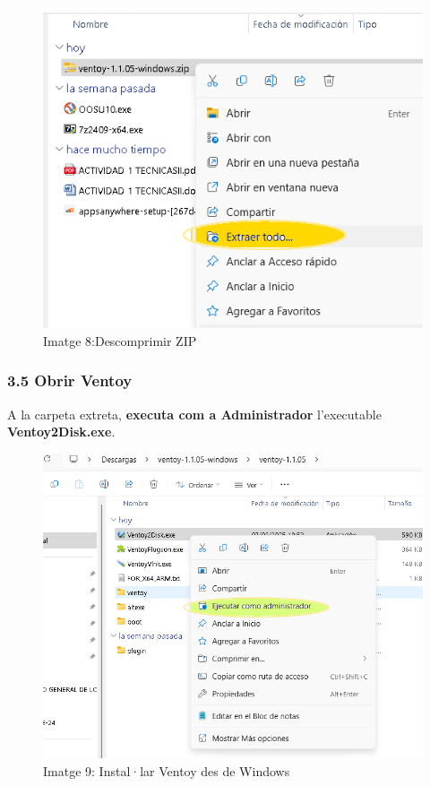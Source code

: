 \documentclass[
  12 pt,
  a4paper,
]{article}
\begin{document}
\begin{figure}
\centering
\includegraphics{png/extraerZip.png}
\caption{Imatge 8:Descomprimir ZIP}
\end{figure}

\subsubsection{3.5 Obrir Ventoy}\label{obrir-ventoy}

A la carpeta extreta, \textbf{executa com a Administrador} l'executable
\textbf{Ventoy2Disk.exe}.

\begin{figure}
\centering
\includegraphics{png/Executar.png}
\caption{Imatge 9: Instal·lar Ventoy des de Windows}
\end{figure}
\end{document}
